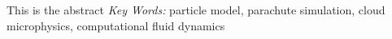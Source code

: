 This is the abstract
{\it Key Words:} particle model, parachute simulation, 
cloud microphysics, computational fluid dynamics 

